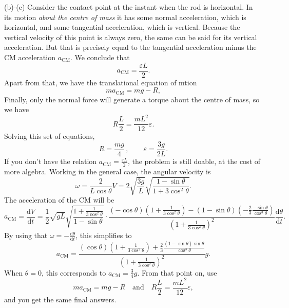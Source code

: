 \documentclass[../TST.tex]{subfiles}
\begin{document}
\begin{solution}
(b)-(c) Consider the contact point at the instant when the rod is horizontal. In its motion \textit{about the centre of mass} it has some normal acceleration, which is horizontal, and some tangential acceleration, which is vertical. Because the vertical velocity of this point is always zero, the same can be said for its vertical acceleration. But that is precisely equal to the tangential acceleration minus the CM acceleration $a_\mathrm{CM}$. We conclude that 
\begin{equation*}
a_\mathrm{CM}= \frac{\varepsilon L}{2}
.
\end{equation*}
Apart from that, we have the translational equation of mtion 
\begin{equation*}
ma_\mathrm{CM}=mg-R, 
\end{equation*}
Finally, only the normal force will generate a torque about the centre of mass, so we have
\begin{equation*}
R \frac{L}{2}= \frac{mL^2}{12}\varepsilon.
\end{equation*}
Solving this set of equations,
\begin{equation*}
	\boxed{R=\frac{mg}{4}}\,, \quad\quad \boxed{\varepsilon = \frac{3g}{2L}.}
\end{equation*}
If you don't have the relation $a_\mathrm{CM}=\frac{\varepsilon L}{2}$, the problem is still doable, at the cost of more algebra. Working in the general case, the angular velocity is
\begin{equation*}
	\omega = \frac{2}{L\cos{\theta}}V=2\sqrt{\frac{3g}{L}}\sqrt{\frac{1-\sin{\theta}}{1+3\cos^2{\theta}}}
.
\end{equation*}
The acceleration of the CM will be
\begin{equation*}
a_\mathrm{CM}=\frac{\mathrm{d}V}{\mathrm{d}t}=
\frac{1}{2}\sqrt{gL}\sqrt{\frac{1+\frac{1}{3\cos^2\theta}}{1-\sin{\theta}}}\cdot \frac{(-\cos{\theta})\left(1+\frac{1}{3\cos^2{\theta}}\right)-(1-\sin{\theta})\left(-\frac{2}{3}\frac{-\sin{\theta}}{\cos^3{\theta}}\right)  }{\left(1+\frac{1}{3\cos^2{\theta}}\right)^2} \frac{\mathrm{d}\theta}{\mathrm{d}t}
.
\end{equation*}
By using that $\omega = -\frac{\mathrm{d}\theta}{\mathrm{d}t}$, this simplifies to
\begin{equation*}
a_\mathrm{CM}=\frac{(\cos{\theta})\left(1+\frac{1}{3\cos^2{\theta}}\right)+\frac{2}{3}\frac{(1-\sin{\theta})\sin{\theta}}{\cos^3{\theta}}  }{\left(1+\frac{1}{3\cos^2{\theta}}\right)^2} g
.
\end{equation*}
When $\theta=0$, this corresponds to $a_\mathrm{CM}=\frac{3}{4}g$. From that point on, use 
\begin{equation*}
ma_\mathrm{CM}=mg-R \quad \mathrm{and} \quad R \frac{L}{2}= \frac{mL^2}{12}\varepsilon,
\end{equation*}
and you get the same final answers.
\end{solution}
\fi
\ifprob 
	\clearpage
\else 
\fi
\end{document}
